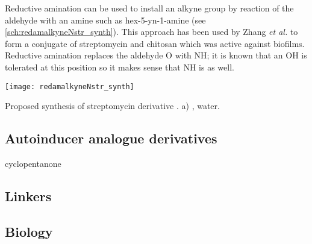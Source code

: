 Reductive amination can be used to install an alkyne group by reaction of the aldehyde with an amine such as hex-5-yn-1-amine  (see \ref{sch:redamalkyneNstr_synth}). This approach has been used by Zhang \textit{et al.}\cite{Zhang2013} to form a conjugate of streptomycin  and chitosan which was active against biofilms. 
Reductive amination replaces the aldehyde O with NH; it is known that an OH is tolerated at this position so it makes sense that NH is as well.

\begin{scheme}[H]
	\begin{center}
		\texttt{[image: redamalkyneNstr\_synth]}
		\caption{Proposed synthesis of streptomycin derivative . 
		a) , water.
		\label{sch:redamalkyneNstr_synth}}
	\end{center}
\end{scheme}



\subsection{Autoinducer analogue derivatives}

cyclopentanone

\subsection{Linkers}

\subsection{Biology}